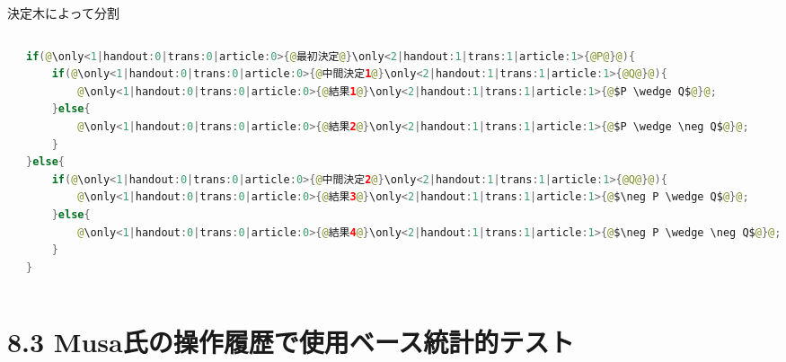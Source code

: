 \begin{frame}[fragile]{決定木によって分割}
\begin{columns}
\begin{column}{0.5\textwidth}

\end{column}

\begin{column}{0.5\textwidth}
\begin{lstlisting}[language=java,escapechar=@]
if(@\only<1|handout:0|trans:0|article:0>{@最初決定@}\only<2|handout:1|trans:1|article:1>{@P@}@){
    if(@\only<1|handout:0|trans:0|article:0>{@中間決定1@}\only<2|handout:1|trans:1|article:1>{@Q@}@){
        @\only<1|handout:0|trans:0|article:0>{@結果1@}\only<2|handout:1|trans:1|article:1>{@$P \wedge Q$@}@;
    }else{
        @\only<1|handout:0|trans:0|article:0>{@結果2@}\only<2|handout:1|trans:1|article:1>{@$P \wedge \neg Q$@}@;
    }
}else{
    if(@\only<1|handout:0|trans:0|article:0>{@中間決定2@}\only<2|handout:1|trans:1|article:1>{@Q@}@){
        @\only<1|handout:0|trans:0|article:0>{@結果3@}\only<2|handout:1|trans:1|article:1>{@$\neg P \wedge Q$@}@;
    }else{
        @\only<1|handout:0|trans:0|article:0>{@結果4@}\only<2|handout:1|trans:1|article:1>{@$\neg P \wedge \neg Q$@}@;
    }
}
\end{lstlisting}
\end{column}
\end{columns}
\end{frame}
\section{8.3 Musa氏の操作履歴で使用ベース統計的テスト}
